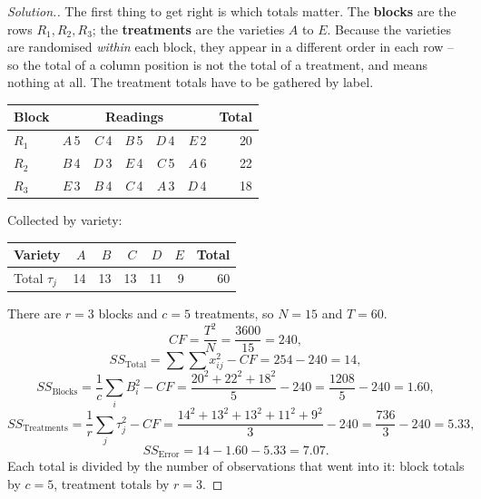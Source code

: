 \documentclass[11pt,a4paper]{article}
\theoremstyle{definition}
\newenvironment{solution}
  {\renewcommand{\qedsymbol}{}\begin{proof}[\textit{Solution}.]}
  {\end{proof}}
\begin{document}
\begin{solution}
The first thing to get right is which totals matter. The \textbf{blocks} are the rows
$R_1, R_2, R_3$; the \textbf{treatments} are the varieties $A$ to $E$. Because the
varieties are randomised \emph{within} each block, they appear in a different order in each
row -- so the total of a column position is not the total of a treatment, and means
nothing at all. The treatment totals have to be gathered by label.

\begin{table}[H]
\centering
\begin{tabular}{lrrrrrr}
Block & \multicolumn{5}{c}{Readings} & Total\\
\hline
$R_1$ & $A$\,5 & $C$\,4 & $B$\,5 & $D$\,4 & $E$\,2 & 20\\
$R_2$ & $B$\,4 & $D$\,3 & $E$\,4 & $C$\,5 & $A$\,6 & 22\\
$R_3$ & $E$\,3 & $B$\,4 & $C$\,4 & $A$\,3 & $D$\,4 & 18\\
\hline
\end{tabular}
\end{table}

Collected by variety:
\begin{table}[H]
\centering
\begin{tabular}{lrrrrrr}
Variety & $A$ & $B$ & $C$ & $D$ & $E$ & Total\\
\hline
Total $\tau_j$ & 14 & 13 & 13 & 11 & 9 & 60\\
\end{tabular}
\end{table}

There are $r=3$ blocks and $c=5$ treatments, so $N=15$ and $T=60$.
\[CF=\frac{T^2}{N}=\frac{3600}{15}=240,\]
\[SS_{\text{Total}}=\sum\sum x_{ij}^2-CF=254-240=14,\]
\[SS_{\text{Blocks}}=\frac{1}{c}\sum_i B_i^2-CF=\frac{20^2+22^2+18^2}{5}-240
=\frac{1208}{5}-240=1.60,\]
\[SS_{\text{Treatments}}=\frac{1}{r}\sum_j \tau_j^2-CF
=\frac{14^2+13^2+13^2+11^2+9^2}{3}-240=\frac{736}{3}-240=5.33,\]
\[SS_{\text{Error}}=14-1.60-5.33=7.07.\]
Each total is divided by the number of observations that went into it: block totals by
$c=5$, treatment totals by $r=3$.


\end{solution}
\end{document}
